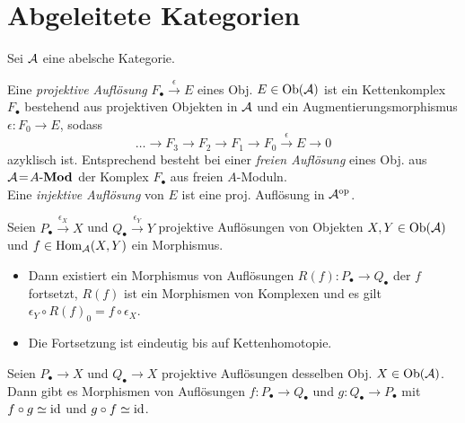 \documentclass{cheat-sheet}
\newcommand{\CC}[1]{{#1}_{\bullet}} %
\begin{document}


\section{Abgeleitete Kategorien}

Sei $\mathcal{A}$ eine abelsche Kategorie.


\begin{defn}
  Eine \emph{projektive Auflösung} $\CC{F} \xrightarrow{\epsilon} E$ eines Obj. $E \in \operatorname{Ob}(\mathcal{A})$ ist ein Kettenkomplex $\CC{F}$ bestehend aus projektiven Objekten in $\mathcal{A}$ und ein Augmentierungsmorphismus $\epsilon : F_0 \to E$, sodass
  \[ \ldots \to F_3 \to F_2 \to F_1 \to F_0 \xrightarrow{\epsilon} E \to 0 \]
  azyklisch ist. Entsprechend besteht bei einer \emph{freien Auflösung} eines Obj. aus $\mathcal{A} \!=\! {A}\text{-}\mathbf{Mod}$ der Komplex $\CC{F}$ aus freien $A$-Moduln. \\
  Eine \emph{injektive Auflösung} von $E$ ist eine proj. Auflösung in $\mathcal{A}^{\mathrm{op}}$.
\end{defn}

\begin{lem}
  Seien $\CC{P} \xrightarrow{\epsilon_X} X$ und $\CC{Q} \xrightarrow{\epsilon_Y} Y$ projektive Auflösungen von Objekten $X, Y \in \operatorname{Ob}(\mathcal{A})$ und $f \in \operatorname{Hom}_{\mathcal{A}}(X, Y)$ ein Morphismus.
  \begin{itemize}
    \item Dann existiert ein Morphismus von Auflösungen $R(f) : \CC{P} \to \CC{Q}$ der $f$ fortsetzt, \dh{} $R(f)$ ist ein Morphismen von Komplexen und es gilt $\epsilon_Y \circ R(f)_0 = f \circ \epsilon_X$.
    \item Die Fortsetzung ist eindeutig bis auf Kettenhomotopie.
  \end{itemize}
\end{lem}

\begin{kor}
  Seien $\CC{P} \to X$ und $\CC{Q} \to X$ projektive Auflösungen desselben Obj. $X \in \operatorname{Ob}(\mathcal{A})$. Dann gibt es Morphismen von Auflösungen $f : \CC{P} \to \CC{Q}$ und $g : \CC{Q} \to \CC{P}$ mit $f \circ g \simeq \operatorname{id}$ und $g \circ f \simeq \operatorname{id}$.
\end{kor}

\end{document}
